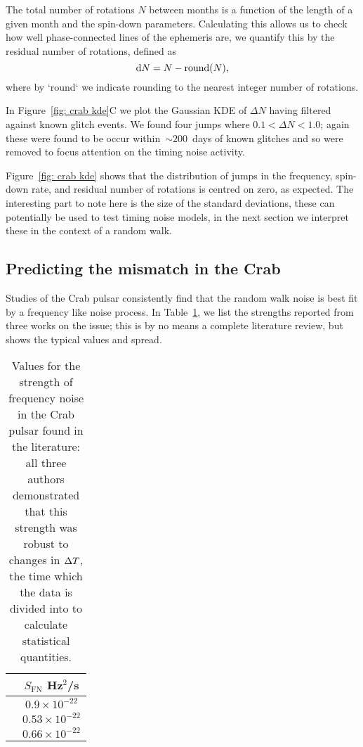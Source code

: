 \documentclass[../full_thesis/full_thesis.tex]{subfiles}
\begin{document}
The total number of rotations $N$ between months is a function of
the length of a given month and the spin-down parameters. Calculating this
allows us to check how well phase-connected lines of the ephemeris are,
we quantify this by the residual number of rotations, defined as
\begin{equation}
\mathrm{d} N = N - \textrm{round}(N),
\end{equation}
where by `round` we indicate rounding to the nearest integer number of rotations.

In Figure~\ref{fig: crab kde}C we plot the Gaussian KDE of $\Delta N$ having filtered
against known glitch events. We found four jumps where $0.1 < \Delta N < 1.0$;
again these were found to be occur within~$\sim200$~days of known glitches and
so were removed to focus attention on the timing noise activity.

Figure~\ref{fig: crab kde} shows that the distribution of jumps in the frequency,
spin-down rate, and residual number of rotations is centred on zero, as
expected. The interesting part to note here is the size of the standard deviations,
these can potentially be used to test timing noise models, in the next section
we interpret these in the context of a random walk.

\subsection{Predicting the mismatch in the Crab}

Studies of the Crab pulsar consistently find that the random walk noise is
best fit by a frequency like noise process. In Table~\ref{tab: SFN lit}, we list
the strengths reported from three works on the issue; this is by no means a
complete literature review, but shows the typical values and spread.
\begin{table}[htb]
\centering
\begin{tabular}{c|c}
 & $S_{\textrm{FN}}$ Hz$^{2}$/s\\ \hline
\citet{Boynton1972} & $0.9\times10^{-22}$\\
\citet{Groth1975} & $ 0.53\times10^{-22}$\\
\citet{Cordes1980} & $0.66\times10^{-22}$
\end{tabular}
\caption{Values for the strength of frequency noise in the Crab pulsar found
         in the literature: all three authors demonstrated that this strength
         was robust to changes in $\Delta T$, the time which the data is divided into
         to calculate statistical quantities.}
\label{tab: SFN lit}
\end{table}
\end{document}
